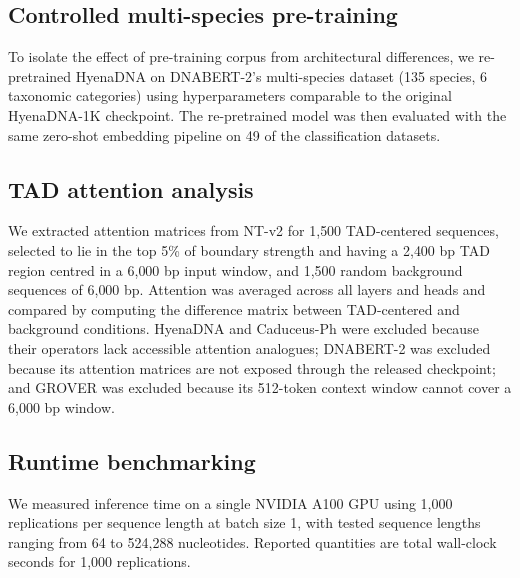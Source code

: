 \documentclass[11pt,a4paper]{article}
\begin{document}
\subsection{Controlled multi-species pre-training}
To isolate the effect of pre-training corpus from architectural differences, we re-pretrained HyenaDNA on DNABERT-2's multi-species dataset (135 species, 6 taxonomic categories) using hyperparameters comparable to the original HyenaDNA-1K checkpoint. The re-pretrained model was then evaluated with the same zero-shot embedding pipeline on 49 of the classification datasets.

\subsection{TAD attention analysis}
We extracted attention matrices from NT-v2 for 1{,}500 TAD-centered sequences, selected to lie in the top 5\% of boundary strength and having a 2{,}400 bp TAD region centred in a 6{,}000 bp input window, and 1{,}500 random background sequences of 6{,}000 bp. Attention was averaged across all layers and heads and compared by computing the difference matrix between TAD-centered and background conditions. HyenaDNA and Caduceus-Ph were excluded because their operators lack accessible attention analogues; DNABERT-2 was excluded because its attention matrices are not exposed through the released checkpoint; and GROVER was excluded because its 512-token context window cannot cover a 6{,}000 bp window.

\subsection{Runtime benchmarking}
We measured inference time on a single NVIDIA A100 GPU using 1{,}000 replications per sequence length at batch size 1, with tested sequence lengths ranging from 64 to 524{,}288 nucleotides. Reported quantities are total wall-clock seconds for 1{,}000 replications.
\end{document}
